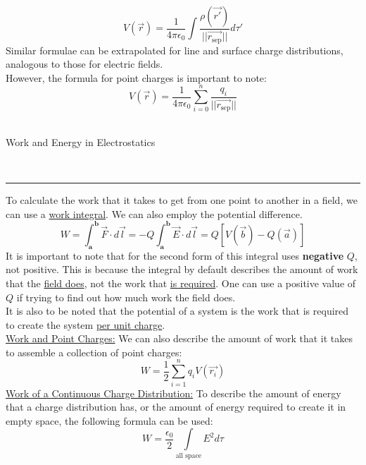 \documentclass{article}
\newcommand{\sepvec}{\vec{r_\textrm{sep}}}
\newcommand{\kfrac}{\frac{1}{4\pi\epsilon_0}}
\newcommand{\header}[1]{\begin{large}\noindent #1\end{large}\\\rule{\textwidth}{0.5pt}}
\newcommand{\gap}{\medskip\\}
\newcommand{\sheader}[1]{\underline{#1:}}
\begin{document}
\[
    V(\vec{r}) = \kfrac \int{\frac{\rho(\vec{r'})}{||\sepvec||}d\tau'}
\]
Similar formulae can be extrapolated for line and surface charge distributions, analogous
to those for electric fields.
\gap
However, the formula for point charges is important to note:
\[
    V(\vec{r}) = \kfrac \sum_{i = 0}^n\frac{q_i}{||\sepvec||}
\]
\pagebreak
\gap
\header{Work and Energy in Electrostatics}
To calculate the work that it takes to get from one point to another in a field,
we can use a \underline{work integral}. We can also employ the potential difference.
\[
    W = \int_{\textbf{a}}^{\textbf{b}} \vec{F} \cdot d\vec{l} = -Q\int_{\textbf{a}}^{\textbf{b}}{\vec{E} \cdot d\vec{l}} = Q[V(\vec{b}) - Q(\vec{a})]
\]
It is important to note that for the second form of this integral uses \textbf{negative} $Q$,
not positive. This is because the integral by default describes the amount of work that
the \underline{field does}, not the work that \underline{is required}. One can use 
a positive value of $Q$ if trying to find out how much work the field does.
\gap
It is also to be noted that the potential of a system is the work that is required
to create the system \underline{per unit charge}.
\gap
\sheader{Work and Point Charges} We can also describe the amount of work that it takes
to assemble a collection of point charges:
\[
    W = \frac{1}{2}\sum_{i = 1}^n{q_i V(\vec{r_i})}    
\]
\sheader{Work of a Continuous Charge Distribution} To describe the amount of energy
that a charge distribution has, or the amount of energy required to create it in 
empty space, the following formula can be used:
\[
    W = \frac{\epsilon_0}{2}\int\limits_{\textrm{all space}}E^2 d\tau    
\]
\end{document}
